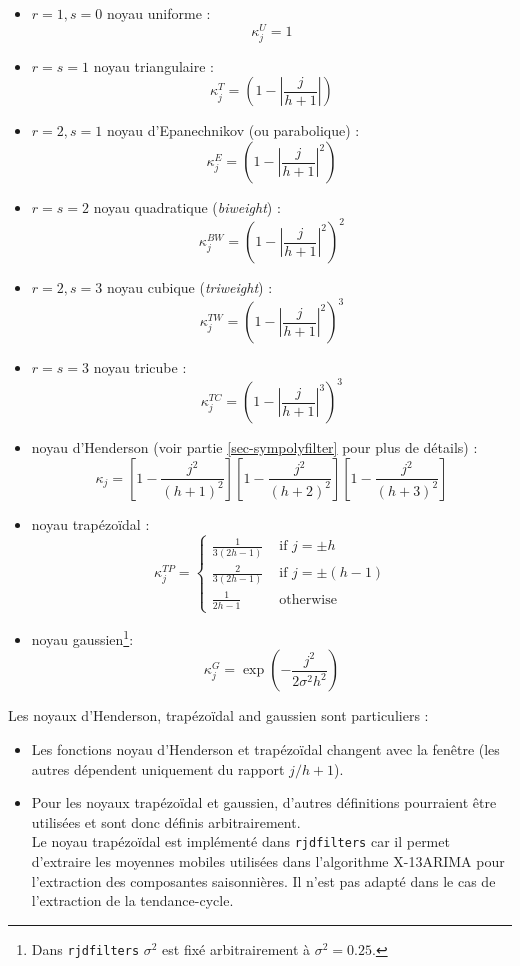 \documentclass[
  11pt,
  french,
  a4paper]{article}
\newcommand\1{\mathds{1}}
\begin{document}
\begin{multicols}{2}

\begin{itemize}
\item
  \(r=1,s=0\) noyau uniforme :
  \[\kappa_j^U=1\]
\item
  \(r=s=1\) noyau triangulaire :
  \[\kappa_j^T=\left(
  1-
  \left\lvert
  \frac j {h+1}
  \right\lvert
  \right)\]
\item
  \(r=2,s=1\) noyau d'Epanechnikov (ou parabolique) :
  \[\kappa_j^E=\left(
  1-
  \left\lvert
  \frac j {h+1}
  \right\lvert^2
  \right)\]
\item
  \(r=s=2\) noyau quadratique (\emph{biweight}) :
  \[\kappa_j^{BW}=\left(
  1-
  \left\lvert
  \frac j {h+1}
  \right\lvert^2
  \right)^2\]
\item
  \(r = 2, s = 3\) noyau cubique (\emph{triweight}) :
  \[\kappa_j^{TW}=\left(
  1-
  \left\lvert
  \frac j {h+1}
  \right\lvert^2
  \right)^3\]
\item
  \(r = s = 3\) noyau tricube :
  \[\kappa_j^{TC}=\left(
  1-
  \left\lvert
  \frac j {h+1}
  \right\lvert^3
  \right)^3\]
\item
  noyau d'Henderson (voir partie \ref{sec-sympolyfilter} pour plus de détails) :
  \[
  \kappa_{j}=\left[1-\frac{j^2}{(h+1)^2}\right]
  \left[1-\frac{j^2}{(h+2)^2}\right]
  \left[1-\frac{j^2}{(h+3)^2}\right]
  \]
\item
  noyau trapézoïdal :
  \[
  \kappa_j^{TP}=
  \begin{cases}
  \frac{1}{3(2h-1)} & \text{ if }j=\pm h 
  \\
  \frac{2}{3(2h-1)} & \text{ if }j=\pm (h-1)\\
  \frac{1}{2h-1}& \text{ otherwise}
  \end{cases}
  \]
\item
  noyau gaussien\footnote{
    Dans \texttt{rjdfilters} \(\sigma^2\) est fixé arbitrairement à \(\sigma^2=0.25\).}:
  \[
  \kappa_j^G=\exp\left(
  -\frac{
  j^2
  }{
  2\sigma^2h^2
  }\right)
  \]
\end{itemize}

\end{multicols}

Les noyaux d'Henderson, trapézoïdal and gaussien sont particuliers :

\begin{itemize}
\item
  Les fonctions noyau d'Henderson et trapézoïdal changent avec la fenêtre (les autres dépendent uniquement du rapport \(j/h+1\)).
\item
  Pour les noyaux trapézoïdal et gaussien, d'autres définitions pourraient être utilisées et sont donc définis arbitrairement.\\
  Le noyau trapézoïdal est implémenté dans \texttt{rjdfilters} car il permet d'extraire les moyennes mobiles utilisées dans l'algorithme X-13ARIMA pour l'extraction des composantes saisonnières.
  Il n'est pas adapté dans le cas de l'extraction de la tendance-cycle.
\end{itemize}
\end{document}

